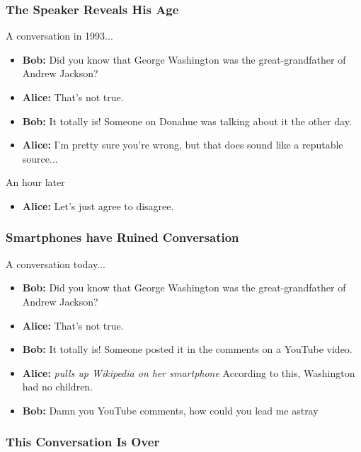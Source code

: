 \documentclass{beamer}
\begin{document}
\begin{frame}
\frametitle{The Speaker Reveals His Age}
    A conversation in 1993...
    \begin{itemize}
        \item \textbf{Bob:} Did you know that George Washington was the
            great-grandfather of Andrew Jackson?
        \item \textbf{Alice:} That's not true.
        \item \textbf{Bob:} It totally is!  Someone on Donahue was talking
            about it the other day.
        \item \textbf{Alice:} I'm pretty sure you're wrong, but that does
            sound like a reputable source...
    \end{itemize}
    An hour later
    \begin{itemize}
        \item \textbf{Alice:} Let's just agree to disagree.
    \end{itemize}
\end{frame}

\begin{frame}
\frametitle{Smartphones have Ruined Conversation}
    A conversation today...
    \begin{itemize}
        \item \textbf{Bob:} Did you know that George Washington was the
            great-grandfather of Andrew Jackson?
        \item \textbf{Alice:} That's not true.
        \item \textbf{Bob:} It totally is!  Someone posted it in the comments
            on a YouTube video.
        \item \textbf{Alice:} \textit{pulls up Wikipedia on her smartphone}
            According to this, Washington had no children.
        \item \textbf{Bob:} Damn you YouTube comments, how could you lead me
            astray\textinterrobang
    \end{itemize}

\end{frame}

\begin{frame}
\frametitle{This Conversation Is Over}
\begin{center}
\end{center}
\end{frame}
\end{document}
